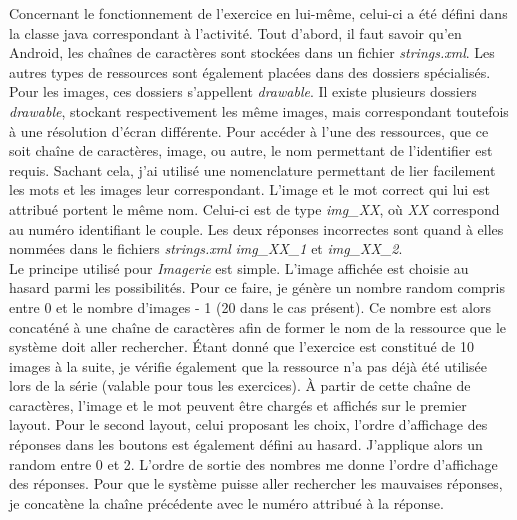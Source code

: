 Concernant le fonctionnement de l'exercice en lui-même, celui-ci a été défini dans la classe java correspondant à l'activité. Tout d'abord, il faut savoir qu'en Android, les chaînes de caractères sont stockées dans un fichier \textit{strings.xml}. Les autres types de ressources sont également placées dans des dossiers spécialisés. Pour les images, ces dossiers s'appellent \textit{drawable}. Il existe plusieurs dossiers \textit{drawable}, stockant respectivement les même images, mais correspondant toutefois à une résolution d'écran différente. Pour accéder à l'une des ressources, que ce soit chaîne de caractères, image, ou autre, le nom permettant de l'identifier est requis. Sachant cela, j'ai utilisé une nomenclature permettant de lier facilement les mots et les images leur correspondant. L'image et le mot correct qui lui est attribué portent le même nom. Celui-ci est de type \textit{img\_XX}, où \textit{XX} correspond au numéro identifiant le couple. Les deux réponses incorrectes sont quand à elles nommées dans le fichiers \textit{strings.xml} \textit{img\_XX\_1} et \textit{img\_XX\_2}.\\

Le principe utilisé pour \textit{Imagerie} est simple. L'image affichée est choisie au hasard parmi les possibilités. Pour ce faire, je génère un nombre random compris entre 0 et le nombre d'images - 1 (20 dans le cas présent). Ce nombre est alors concaténé à une chaîne de caractères afin de former le nom de la ressource que le système doit aller rechercher. Étant donné que l'exercice est constitué de 10 images à la suite, je vérifie également que la ressource n'a pas déjà été utilisée lors de la série (valable pour tous les exercices). À partir de cette chaîne de caractères, l'image et le mot peuvent être chargés et affichés sur le premier layout. Pour le second layout, celui proposant les choix, l'ordre d'affichage des réponses dans les boutons est également défini au hasard. J'applique alors un random entre 0 et 2. L'ordre de sortie des nombres me donne l'ordre d'affichage des réponses. Pour que le système puisse aller rechercher les mauvaises réponses, je concatène la chaîne précédente avec le numéro attribué à la réponse.\\

 
